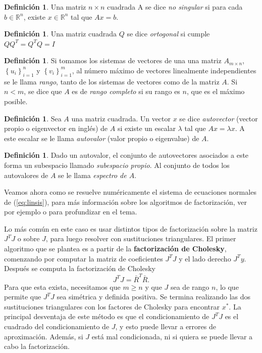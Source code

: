 \documentclass[11pt,a4paper]{book}
\theoremstyle{definition}
\newtheorem{definition}[theorem]{Definición}
\theoremstyle{remark}
\newcommand{\sucesion}[1]{\left\{#1\right\}}
\begin{document}
\begin{definition}
	Una matriz $n \times n$ cuadrada A se dice \textit{no singular} si para cada $b \in \mathbb{R}^n$, existe $x\in\mathbb{R}^n$ tal que $Ax=b$.
\end{definition}

\begin{definition}
	Una matriz cuadrada $Q$ se dice \textit{ortogonal} si cumple $QQ^T=Q^TQ=I$
\end{definition}

\begin{definition}
	Si tomamos los sistemas de vectores de una una matriz $A_{m \times n}$, $\sucesion{u_i}_{i=1}^n$ y $\sucesion{v_i}_{i=1}^m$, al número máximo de vectores linealmente independientes se le llama \textit{rango}, tanto de los sistemas de vectores como de la matriz $A$. Si $n<m$, se dice que $A$ es de \textit{rango completo} si su rango es $n$, que es el máximo posible.
\end{definition}

\begin{definition}
	Sea $A$ una matriz cuadrada. Un vector $x$ se dice \textit{autovector} (vector propio o
	eigenvector en inglés) de $A$ si existe un
	escalar $\lambda$ tal que $Ax=\lambda x$. A este escalar se le llama \textit{autovalor} 
	(valor propio o eigenvalue) de $A$.
\end{definition}	
\begin{definition}
	Dado un autovalor, el conjunto de autovectores asociados
	a este forma un subespacio llamado \textit{subespacio propio}.
	Al conjunto de todos los autovalores de $A$ se le llama \textit{espectro de $A$}.
\end{definition}

Veamos ahora como se resuelve numéricamente el sistema de ecuaciones normales de (\ref{eq:linsis}), para más información sobre los algoritmos de factorización, ver por ejemplo \cite{Trefethen1997-ek} o \cite{Golub2013-li} para profundizar en el tema.

Lo más común en este caso es usar distintos tipos de factorización sobre la matriz $J^TJ$ o sobre $J$, para luego resolver con sustituciones triangulares.
El primer algoritmo que se plantea es a partir de la \textbf{factorización de Cholesky}, comenzando por computar la matriz de coeficientes $J^TJ$ y el lado derecho $J^Ty$. Después se computa la factorización de Cholesky
\begin{equation}
	J^TJ = \bar R^T\bar R.
\end{equation}
Para que esta exista, necesitamos que $m \geq n$ y que $J$ sea de rango $n$,
lo que permite que $J^TJ$ sea simétrica y definida positiva.
Se termina realizando las dos sustituciones triangulares con los factores de Cholesky para encontrar $x^*$.
La principal desventaja de este método es que el condicionamiento de $J^TJ$ es el cuadrado del condicionamiento de $J$, y esto puede llevar a errores de aproximación.
Además, si $J$ está mal condicionada, ni si quiera se puede llevar a cabo la factorización.
\end{document}
